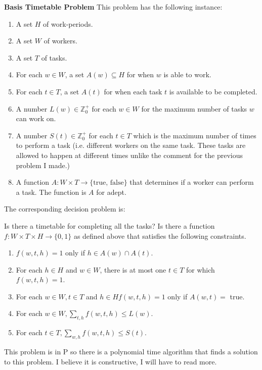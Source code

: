 \documentclass[12pt]{article}
\theoremstyle{definition}
\numberwithin{equation}{section}
\newcommand{\Z}{\mathbb{Z}}
\newcommand{\func}[3]{#1\colon #2 \rightarrow #3}
\newcommand{\ssteq}{\subseteq}
\begin{document}
\textbf{Basis Timetable Problem}
This problem has the following instance:
\begin{enumerate}
	\item A set $H$ of work-periods.
	\item A set $W$ of workers.
	\item A set $T$ of tasks.  
	\item For each $w \in W$, a set $A(w) \ssteq H$ for when $w$ is able to work. 
	\item For each $t \in T$, a set $A(t)$ for when each task $t$ is available to be completed. 
	\item A number $L(w) \in \Z_0^+$ for each $w \in W$ for the maximum number of tasks $w$ can work on. 
	\item A number $S(t) \in \Z_0^+$ for each $t \in T$ which is the maximum number of times to perform a task (i.e. different workers on the same task. These tasks are allowed to happen at different times unlike the comment for the previous problem I made.)
	\item A function $\func{A}{W \times T}{\{\text{true, false}\}}$ that determines if a worker can perform a task. The function is $A$ for adept.
\end{enumerate}
The corresponding decision problem is:

Is there a timetable for completing all the tasks? Is there a function $\func{f}{W\times T\times H}{\{0,1\}}$ as defined above that satisfies the following constraints. 

\begin{enumerate}
	\item $f(w,t,h) = 1$ only if $h \in A(w) \cap A(t)$.  
	\item  For each $h \in H$ and $w \in W$, there is at most one $t \in T$ for which $f(w,t,h) = 1$. 
	\item For each $w \in W, t \in T$ and $h \in H f(w,t,h) = 1$ only if $A(w,t) = $ true.
	\item For each $w \in W, \sum_{t,h} f(w,t,h) \le L(w)$.
	\item For each $t \in T, \sum_{w,h} f(w,t,h) \le S(t)$. 
\end{enumerate}

This problem is in P so there is a polynomial time algorithm that finds a solution to this problem. I believe it is constructive, I will have to read more. 
\end{document}

